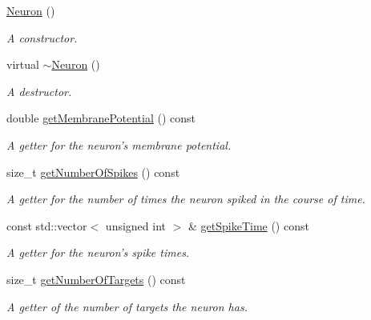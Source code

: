 \begin{DoxyCompactItemize}
\item 
\hypertarget{classNeuron_a823487d01615fadb8ac19a2768dd9d96}{\hyperlink{classNeuron_a823487d01615fadb8ac19a2768dd9d96}{Neuron} ()}\label{classNeuron_a823487d01615fadb8ac19a2768dd9d96}

\begin{DoxyCompactList}\small\item\em A constructor. \end{DoxyCompactList}\item 
\hypertarget{classNeuron_a94a250ce7e167760e593979b899745b1}{virtual \hyperlink{classNeuron_a94a250ce7e167760e593979b899745b1}{$\sim$\-Neuron} ()}\label{classNeuron_a94a250ce7e167760e593979b899745b1}

\begin{DoxyCompactList}\small\item\em A destructor. \end{DoxyCompactList}\item 
double \hyperlink{classNeuron_a86341dee7a81765fe4840777a008c688}{get\-Membrane\-Potential} () const 
\begin{DoxyCompactList}\small\item\em A getter for the neuron's membrane potential. \end{DoxyCompactList}\item 
size\-\_\-t \hyperlink{classNeuron_a9497c01c1513b480cb96488e104c8b00}{get\-Number\-Of\-Spikes} () const 
\begin{DoxyCompactList}\small\item\em A getter for the number of times the neuron spiked in the course of time. \end{DoxyCompactList}\item 
const std\-::vector$<$ unsigned int $>$ \& \hyperlink{classNeuron_ae87bb09d99e4e9c2185be8b73fc242ba}{get\-Spike\-Time} () const 
\begin{DoxyCompactList}\small\item\em A getter for the neuron's spike times. \end{DoxyCompactList}\item 
size\-\_\-t \hyperlink{classNeuron_a785f2fa8ab4f76dbc6a4b2a18c15da35}{get\-Number\-Of\-Targets} () const 
\begin{DoxyCompactList}\small\item\em A getter of the number of targets the neuron has. \end{DoxyCompactList}\item 

\end{DoxyCompactItemize}
